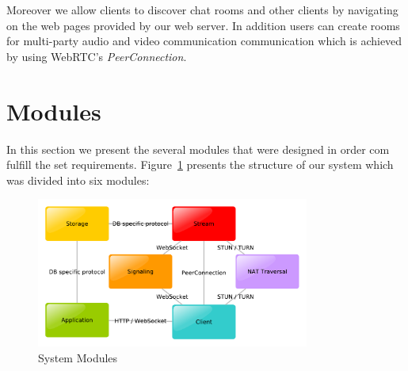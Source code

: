 
	Moreover we allow clients to discover chat rooms and other clients by navigating on the web pages provided by our web server. In addition users can create rooms for multi-party audio and video communication communication which is achieved by using \ac{WebRTC}'s \emph{PeerConnection}.
        
\section{Modules}
In this section we present the several modules that were designed in order com fulfill the set requirements.
	Figure~\ref{fig:modules} presents the structure of our system which was divided into six modules:


\begin{figure}
	\centering
	\includegraphics[width=0.8\textwidth]{figures/modules.pdf}
	\caption{System Modules}
    \label{fig:modules}
\end{figure}




